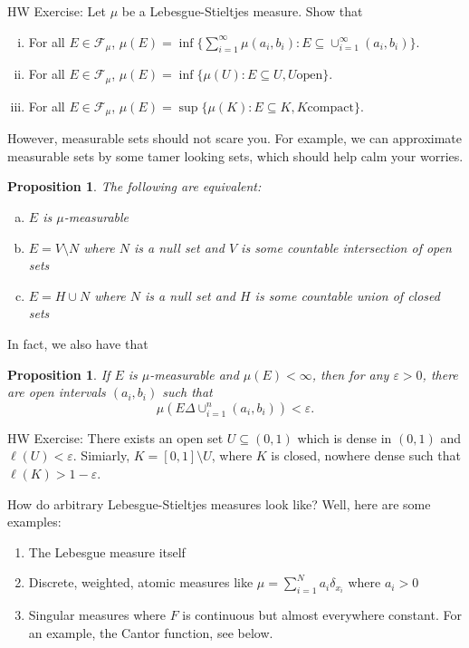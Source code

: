 \documentclass{article}
\newtheorem{proposition}[theorem]{Proposition}
\theoremstyle{definition}
\begin{document}
HW Exercise: Let \( \mu \) be a Lebesgue-Stieltjes measure. Show that
\begin{enumerate}[i)]
    \item For all \( E \in \mathcal{F}_{\mu} \), \( \mu(E) = \inf \{ \sum
        _{i = 1}^{\infty} \mu(a_{i}, b_{i}) : E \subseteq
        \cup_{i = 1}^{\infty} (a_{i}, b_{i})
        \}\).
    \item For all \( E \in \mathcal{F}_{\mu} \), \( \mu(E) = \inf \{
            \mu(U) : E \subseteq U, U \text{open} \} \).
    \item For all \( E \in \mathcal{F}_{\mu} \), \( \mu(E) = \sup \{
            \mu(K) : E \subseteq K, K \text{compact} \} \).
\end{enumerate}

However, measurable sets should not scare you. For example, we can
approximate measurable sets by some tamer looking sets, which should help
calm your worries.
\begin{proposition}
    The following are equivalent:
\begin{enumerate}[a)]
    \item \(E\) is \( \mu \)-measurable
    \item \( E = V \setminus N \) where \(N\) is a null set and \( V \) is
        some countable intersection of open sets
    \item \( E = H \cup N \) where \(N\) is a null set and \( H \) is
        some countable union of closed sets
\end{enumerate}
\end{proposition}

In fact, we also have that

\begin{proposition}
    If \( E \) is \(\mu\)-measurable and \( \mu(E) < \infty \), then for any
    \( \varepsilon > 0 \), there are open intervals \( (a_{i}, b_{i}) \)
    such that
    \begin{displaymath}
        \mu(E \Delta \cup_{i = 1}^{n} (a_{i}, b_{i})) < \varepsilon.
    \end{displaymath}
\end{proposition}


HW Exercise:
There exists an open set \( U \subseteq (0,1) \) which is dense in \( (0,1)
\) and \( \ell(U) < \varepsilon \).
Simiarly, \(K = [0,1] \setminus U\), where \(K\) is closed, nowhere dense such that \(
\ell(K) > 1 - \varepsilon \).


\bigskip

How do arbitrary Lebesgue-Stieltjes measures look like? Well, here are some examples:
\begin{enumerate}[1)]
    \item The Lebesgue measure itself
    \item Discrete, weighted, atomic measures like \( \mu = \sum_{i = 1}^{N} a_{i} \delta
        _{x_{i}} \) where \( a_{i} > 0 \)
    \item Singular measures where \( F \) is continuous but almost
			everywhere constant. For an example, the Cantor function, see below.
\end{enumerate}
\end{document}
